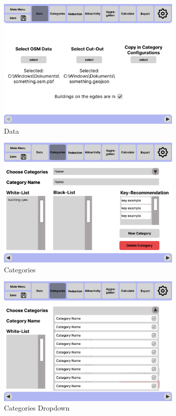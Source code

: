 \documentclass[parskip=full]{scrartcl} %
\begin{document}
\begin{figure}
    \centering
    \includegraphics[width=0.8\textwidth,cfbox=black 1pt 0pt]{pictures/Data.png}
    \caption{Data}
\end{figure}

\begin{figure}
    \centering
    \includegraphics[width=0.8\textwidth,cfbox=black 1pt 0pt]{pictures/Categories.png}
    \caption{Categories}
\end{figure}

\begin{figure}
    \centering
    \includegraphics[width=0.8\textwidth,cfbox=black 1pt 0pt]{pictures/Categories 2.png}
    \caption{Categories Dropdown}
\end{figure}
\end{document}
